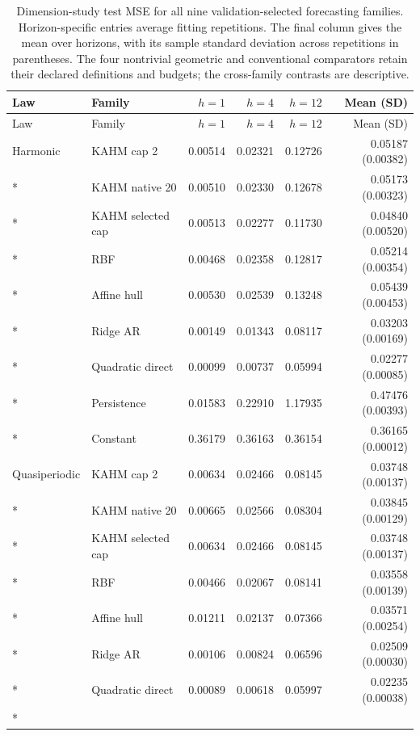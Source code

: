 \begingroup\small
\setlength{\tabcolsep}{3pt}
\begin{longtable}{@{}llrrrr@{}}
\caption{Dimension-study test MSE for all nine validation-selected
forecasting families. Horizon-specific entries average fitting repetitions.
The final column gives the mean over horizons, with its sample standard
deviation across repetitions in parentheses. The four nontrivial geometric
and conventional comparators retain their declared definitions and budgets;
the cross-family contrasts are descriptive.}
\label{tab:dimension-full-results}\\
\toprule Law & Family & $h=1$ & $h=4$ & $h=12$ & Mean (SD) \\
\midrule\endfirsthead
\toprule Law & Family & $h=1$ & $h=4$ & $h=12$ & Mean (SD) \\
\midrule\endhead
\bottomrule\endfoot
Harmonic & KAHM cap 2 & 0.00514 & 0.02321 & 0.12726 & 0.05187 (0.00382) \\*
 & KAHM native 20 & 0.00510 & 0.02330 & 0.12678 & 0.05173 (0.00323) \\*
 & KAHM selected cap & 0.00513 & 0.02277 & 0.11730 & 0.04840 (0.00520) \\*
 & RBF & 0.00468 & 0.02358 & 0.12817 & 0.05214 (0.00354) \\*
 & Affine hull & 0.00530 & 0.02539 & 0.13248 & 0.05439 (0.00453) \\*
 & Ridge AR & 0.00149 & 0.01343 & 0.08117 & 0.03203 (0.00169) \\*
 & Quadratic direct & 0.00099 & 0.00737 & 0.05994 & 0.02277 (0.00085) \\*
 & Persistence & 0.01583 & 0.22910 & 1.17935 & 0.47476 (0.00393) \\*
 & Constant & 0.36179 & 0.36163 & 0.36154 & 0.36165 (0.00012) \\
\addlinespace
Quasiperiodic & KAHM cap 2 & 0.00634 & 0.02466 & 0.08145 & 0.03748 (0.00137) \\*
 & KAHM native 20 & 0.00665 & 0.02566 & 0.08304 & 0.03845 (0.00129) \\*
 & KAHM selected cap & 0.00634 & 0.02466 & 0.08145 & 0.03748 (0.00137) \\*
 & RBF & 0.00466 & 0.02067 & 0.08141 & 0.03558 (0.00139) \\*
 & Affine hull & 0.01211 & 0.02137 & 0.07366 & 0.03571 (0.00254) \\*
 & Ridge AR & 0.00106 & 0.00824 & 0.06596 & 0.02509 (0.00030) \\*
 & Quadratic direct & 0.00089 & 0.00618 & 0.05997 & 0.02235 (0.00038) \\*

\end{longtable}
